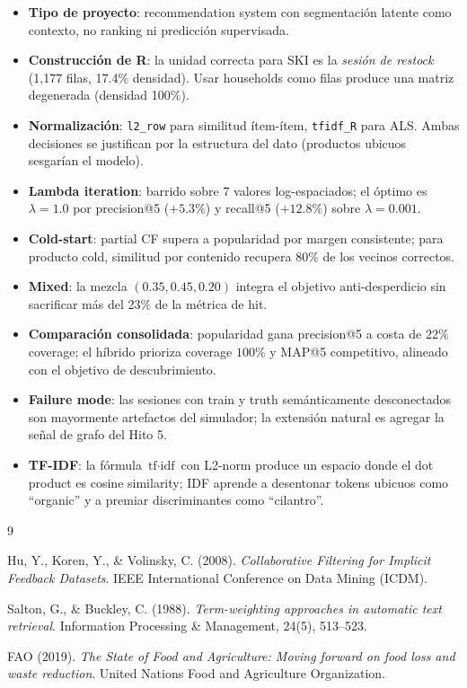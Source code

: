 \documentclass[12pt,a4paper]{article}
\newcommand{\code}[1]{\texttt{\small #1}}
\begin{document}
\begin{itemize}
    \item \textbf{Tipo de proyecto}: recommendation system con segmentación latente como contexto, no ranking ni predicción supervisada.
    \item \textbf{Construcción de R}: la unidad correcta para SKI es la \textit{sesión de restock} (1{,}177 filas, 17.4\% densidad). Usar households como filas produce una matriz degenerada (densidad 100\%).
    \item \textbf{Normalización}: \code{l2\_row} para similitud ítem-ítem, \code{tfidf\_R} para ALS. Ambas decisiones se justifican por la estructura del dato (productos ubicuos sesgarían el modelo).
    \item \textbf{Lambda iteration}: barrido sobre 7 valores log-espaciados; el óptimo es $\lambda = 1.0$ por precision@5 ($+5.3\%$) y recall@5 ($+12.8\%$) sobre $\lambda = 0.001$.
    \item \textbf{Cold-start}: partial CF supera a popularidad por margen consistente; para producto cold, similitud por contenido recupera 80\% de los vecinos correctos.
    \item \textbf{Mixed}: la mezcla $(0.35, 0.45, 0.20)$ integra el objetivo anti-desperdicio sin sacrificar más del 23\% de la métrica de hit.
    \item \textbf{Comparación consolidada}: popularidad gana precision@5 a costa de $22\%$ coverage; el híbrido prioriza coverage $100\%$ y MAP@5 competitivo, alineado con el objetivo de descubrimiento.
    \item \textbf{Failure mode}: las sesiones con train y truth semánticamente desconectados son mayormente artefactos del simulador; la extensión natural es agregar la señal de grafo del Hito 5.
    \item \textbf{TF-IDF}: la fórmula $\text{tf} \cdot \text{idf}$ con L2-norm produce un espacio donde el dot product es cosine similarity; IDF aprende a desentonar tokens ubicuos como ``organic'' y a premiar discriminantes como ``cilantro''.
\end{itemize}

\begin{thebibliography}{9}

Hu, Y., Koren, Y., \& Volinsky, C. (2008). \textit{Collaborative Filtering for Implicit Feedback Datasets}. IEEE International Conference on Data Mining (ICDM).

Salton, G., \& Buckley, C. (1988). \textit{Term-weighting approaches in automatic text retrieval}. Information Processing \& Management, 24(5), 513--523.

FAO (2019). \textit{The State of Food and Agriculture: Moving forward on food loss and waste reduction}. United Nations Food and Agriculture Organization.

\end{thebibliography}
\end{document}
